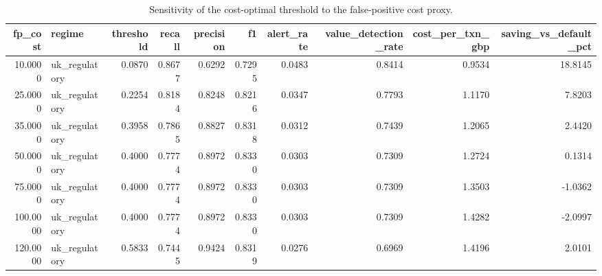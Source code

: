 \begin{table}
\caption{Sensitivity of the cost-optimal threshold to the false-positive cost proxy.}
\label{tab:table4_sensitivity_fp_cost}
\begin{tabular}{rlrrrrrrrr}
\toprule
fp\_cost & regime & threshold & recall & precision & f1 & alert\_rate & value\_detection\_rate & cost\_per\_txn\_gbp & saving\_vs\_default\_pct \\
\midrule
10.0000 & uk\_regulatory & 0.0870 & 0.8677 & 0.6292 & 0.7295 & 0.0483 & 0.8414 & 0.9534 & 18.8145 \\
25.0000 & uk\_regulatory & 0.2254 & 0.8184 & 0.8248 & 0.8216 & 0.0347 & 0.7793 & 1.1170 & 7.8203 \\
35.0000 & uk\_regulatory & 0.3958 & 0.7865 & 0.8827 & 0.8318 & 0.0312 & 0.7439 & 1.2065 & 2.4420 \\
50.0000 & uk\_regulatory & 0.4000 & 0.7774 & 0.8972 & 0.8330 & 0.0303 & 0.7309 & 1.2724 & 0.1314 \\
75.0000 & uk\_regulatory & 0.4000 & 0.7774 & 0.8972 & 0.8330 & 0.0303 & 0.7309 & 1.3503 & -1.0362 \\
100.0000 & uk\_regulatory & 0.4000 & 0.7774 & 0.8972 & 0.8330 & 0.0303 & 0.7309 & 1.4282 & -2.0997 \\
120.0000 & uk\_regulatory & 0.5833 & 0.7445 & 0.9424 & 0.8319 & 0.0276 & 0.6969 & 1.4196 & 2.0101 \\
\bottomrule
\end{tabular}
\end{table}
